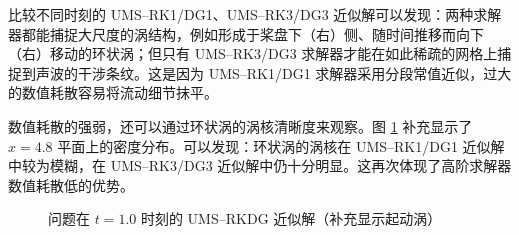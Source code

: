 比较不同时刻的 UMS–RK1/DG1、UMS–RK3/DG3 近似解可以发现：两种求解器都能捕捉大尺度的涡结构，例如形成于桨盘下（右）侧、随时间推移而向下（右）移动的环状涡；但只有
UMS–RK3/DG3 求解器才能在如此稀疏的网格上捕捉到声波的干涉条纹。这是因为 UMS–RK1/DG1 求解器采用分段常值近似，过大的数值耗散容易将流动细节抹平。

数值耗散的强弱，还可以通过环状涡的涡核清晰度来观察。图 \ref{fig:upward_ring} 补充显示了 $x=4.8$
平面上的密度分布。可以发现：环状涡的涡核在 UMS–RK1/DG1 近似解中较为模糊，在 UMS–RK3/DG3 近似解中仍十分明显。这再次体现了高阶求解器数值耗散低的优势。

\begin{figure}[h!]
\begin{centering}
\par\end{centering}
\begin{centering}
\par\end{centering}
\caption{\label{fig:upward_ring}问题在
$t=1.0$ 时刻的 UMS–RKDG 近似解（补充显示起动涡）}
\end{figure}


